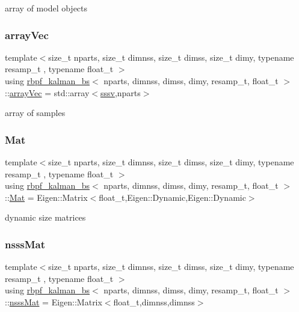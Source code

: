 array of model objects \mbox{\label{classrbpf__kalman__bs_ae4f4df4fb0cffea207901b0d358a519b}} 
\subsubsection{\texorpdfstring{array\+Vec}{arrayVec}}
{\footnotesize\ttfamily template$<$size\+\_\+t nparts, size\+\_\+t dimnss, size\+\_\+t dimss, size\+\_\+t dimy, typename resamp\+\_\+t , typename float\+\_\+t $>$ \\
using \hyperlink{classrbpf__kalman__bs}{rbpf\+\_\+kalman\+\_\+bs}$<$ nparts, dimnss, dimss, dimy, resamp\+\_\+t, float\+\_\+t $>$\+::\hyperlink{classrbpf__kalman__bs_ae4f4df4fb0cffea207901b0d358a519b}{array\+Vec} =  std\+::array$<$\hyperlink{classrbpf__kalman__bs_a2b40c9fa0d7a2ca42be3d0c43db0db8b}{sssv},nparts$>$}

array of samples \mbox{\label{classrbpf__kalman__bs_add5db33a27f25ec3e72ecd8e4c9ce755}} 
\subsubsection{\texorpdfstring{Mat}{Mat}}
{\footnotesize\ttfamily template$<$size\+\_\+t nparts, size\+\_\+t dimnss, size\+\_\+t dimss, size\+\_\+t dimy, typename resamp\+\_\+t , typename float\+\_\+t $>$ \\
using \hyperlink{classrbpf__kalman__bs}{rbpf\+\_\+kalman\+\_\+bs}$<$ nparts, dimnss, dimss, dimy, resamp\+\_\+t, float\+\_\+t $>$\+::\hyperlink{classrbpf__kalman__bs_add5db33a27f25ec3e72ecd8e4c9ce755}{Mat} =  Eigen\+::\+Matrix$<$float\+\_\+t,Eigen\+::\+Dynamic,Eigen\+::\+Dynamic$>$}

dynamic size matrices \mbox{\label{classrbpf__kalman__bs_a0d3dfd24b849c0bf33fa3df8ce56dd07}} 
\subsubsection{\texorpdfstring{nsss\+Mat}{nsssMat}}
{\footnotesize\ttfamily template$<$size\+\_\+t nparts, size\+\_\+t dimnss, size\+\_\+t dimss, size\+\_\+t dimy, typename resamp\+\_\+t , typename float\+\_\+t $>$ \\
using \hyperlink{classrbpf__kalman__bs}{rbpf\+\_\+kalman\+\_\+bs}$<$ nparts, dimnss, dimss, dimy, resamp\+\_\+t, float\+\_\+t $>$\+::\hyperlink{classrbpf__kalman__bs_a0d3dfd24b849c0bf33fa3df8ce56dd07}{nsss\+Mat} =  Eigen\+::\+Matrix$<$float\+\_\+t,dimnss,dimnss$>$}

